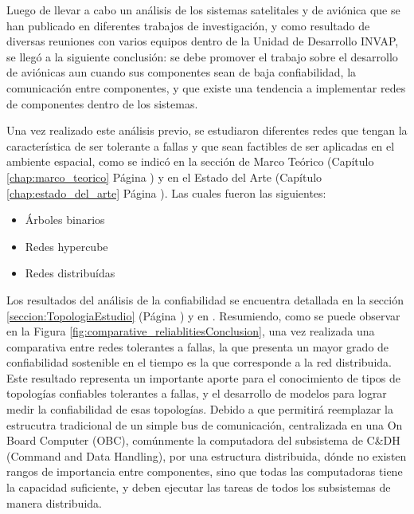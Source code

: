 Luego de llevar a cabo un análisis de los sistemas satelitales y de aviónica que se
han publicado en diferentes trabajos de investigación, y como resultado de  diversas reuniones
con varios equipos dentro de la Unidad de Desarrollo INVAP, se llegó a la siguiente conclusión:
se debe promover el trabajo sobre el desarrollo de aviónicas aun cuando sus componentes
sean de baja confiabilidad, la comunicación entre componentes,
y que existe una tendencia a implementar redes de componentes dentro de los sistemas.

Una vez realizado este análisis previo, se estudiaron diferentes redes que tengan
la característica de ser tolerante a fallas y que sean factibles de ser
aplicadas en el ambiente espacial, como se indicó en la sección de Marco
Teórico (Capítulo \ref{chap:marco_teorico} Página \pageref{chap:marco_teorico}) y en
el Estado del Arte (Capítulo \ref{chap:estado_del_arte} Página \pageref{chap:estado_del_arte}).
Las cuales fueron las siguientes:
\begin{itemize}
\item Árboles binarios
\item Redes hypercube
\item Redes distribuídas
\end{itemize}

Los resultados del análisis de la confiabilidad se encuentra detallada en la sección
\ref{seccion:TopologiaEstudio} (Página \pageref{seccion:TopologiaEstudio}) y en
\cite{Arias17}. Resumiendo, como se puede observar en la Figura
\ref{fig:comparative_reliablitiesConclusion}, una vez realizada una comparativa
entre redes tolerantes a fallas, la que presenta un mayor grado
de confiabilidad sostenible en el tiempo es la que corresponde a
la red distribuida. Este resultado representa un importante aporte para el
conocimiento de tipos de topologías confiables tolerantes a fallas, y el desarrollo de
modelos para lograr medir la confiabilidad de esas topologías. Debido a que
permitirá reemplazar la estrucutra tradicional de un simple bus de comunicación, centralizada
en una On Board Computer (OBC), comúnmente la computadora del subsistema de C&DH
(Command and Data Handling), por una estructura distribuida, dónde no existen
rangos de importancia entre componentes,  sino que todas las computadoras
tiene la capacidad suficiente, y deben ejecutar las tareas de todos los subsistemas
de manera distribuida. 

\begin{comment}
Los resultados de
este estudio fueron presentados en el \textit{Congreso Argentino de Tecnologías
  Espaciales 2017 (Córdoba, Argentina)}
\end{comment}

